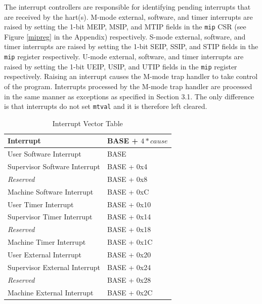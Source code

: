 \documentclass[12pt]{article}
\begin{document}
The interrupt controllers are responsible for identifying pending interrupts that are received by the hart(s). M-mode external, software, and timer interrupts are raised by setting the 1-bit MEIP, MSIP, and MTIP fields in the {\tt{mip}} CSR (see Figure \ref{mipreg} in the Appendix) respectively. S-mode external, software, and timer interrupts are raised by setting the 1-bit SEIP, SSIP, and STIP fields in the {\tt{mip}} register respectively. U-mode external, software, and timer interrupts are raised by setting the 1-bit UEIP, USIP, and UTIP fields in the {\tt{mip}} register respectively. Raising an interrupt causes the M-mode trap handler to take control of the program. Interrupts processed by the M-mode trap handler are processed in the same manner as exceptions as specified in Section 3.1. The only difference is that interrupts do not set {\tt{mtval}} and it is therefore left cleared. 

\begin{table}
\centering
\begin{tabular}{| l | l |}
\hline
Interrupt & BASE + $4*cause$ \\
\hline
User Software Interrupt & BASE \\
\hline
Supervisor Software Interrupt & BASE + 0x4 \\
\hline
\emph{Reserved} & BASE + 0x8 \\ 
\hline
Machine Software Interrupt & BASE + 0xC \\ 
\hline
User Timer Interrupt & BASE + 0x10 \\
\hline
Supervisor Timer Interrupt & BASE + 0x14 \\ 
\hline
\emph{Reserved} & BASE + 0x18 \\ 
\hline
Machine Timer Interrupt & BASE + 0x1C \\ 
\hline
User External Interrupt & BASE + 0x20 \\ 
\hline
Supervisor External Interrupt & BASE + 0x24 \\ 
\hline
\emph{Reserved} & BASE + 0x28 \\ 
\hline
Machine External Interrupt & BASE + 0x2C \\ 
\hline
\end{tabular}
\caption{Interrupt Vector Table}
\label{interruptvectors}
\end{table}
\end{document}
